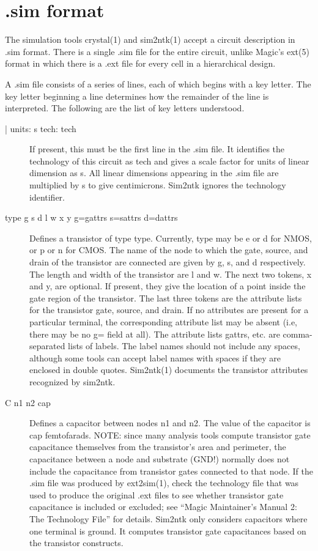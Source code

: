 \section{.sim format}

The simulation tools crystal(1) and sim2ntk(1) accept a circuit
description in .sim format.  There is a single .sim file for the
entire circuit, unlike Magic's ext(5) format in which there is a .ext
file for every cell in a hierarchical design.

A .sim file consists of a series of lines, each of which
begins with a key letter.  The key letter beginning a line
determines how the remainder of the line is interpreted.
The following are the list of key letters understood.

\begin{description}
\item[| units: s  tech: tech]
If present, this must be the first line in the .sim
file.  It identifies the technology of this circuit as
tech and gives a scale factor for units of linear
dimension as s.  All linear dimensions appearing in the
.sim file are multiplied by s to give centimicrons.
Sim2ntk ignores the technology identifier.

\item[type  g  s  d  l  w  x  y  g=gattrs  s=sattrs  d=dattrs]
Defines a transistor of type type.  Currently, type may
be e or d for NMOS, or p or n for CMOS.  The name of
the node to which the gate, source, and drain of the
transistor are connected are given by g, s, and d
respectively.  The length and width of the transistor
are l and w.  The next two tokens, x and y, are
optional.  If present, they give the location of a
point inside the gate region of the transistor.  The
last three tokens are the attribute lists for the
transistor gate, source, and drain.  If no attributes
are present for a particular terminal, the corresponding
attribute list may be absent (i.e, there may be no
g= field at all).  The attribute lists gattrs, etc. are
comma-separated lists of labels.  The label names
should not include any spaces, although some tools can
accept label names with spaces if they are enclosed in
double quotes.  Sim2ntk(1) documents the transistor
attributes recognized by sim2ntk.

\item[C n1 n2 cap]
Defines a capacitor between nodes n1 and n2.  The value
of the capacitor is cap femtofarads.  NOTE: since many
analysis tools compute transistor gate capacitance
themselves from the transistor's area and perimeter,
the capacitance between a node and substrate (GND!)
normally does not include the capacitance from transistor
gates connected to that node.  If the .sim file was
produced by ext2sim(1), check the technology file that
was used to produce the original .ext files to see
whether transistor gate capacitance is included or
excluded; see ``Magic Maintainer's Manual 2: The Technology
File'' for details.  Sim2ntk only considers
capacitors where one terminal is ground.  It computes
transistor gate capacitances based on the transistor
constructs.


\end{description}
